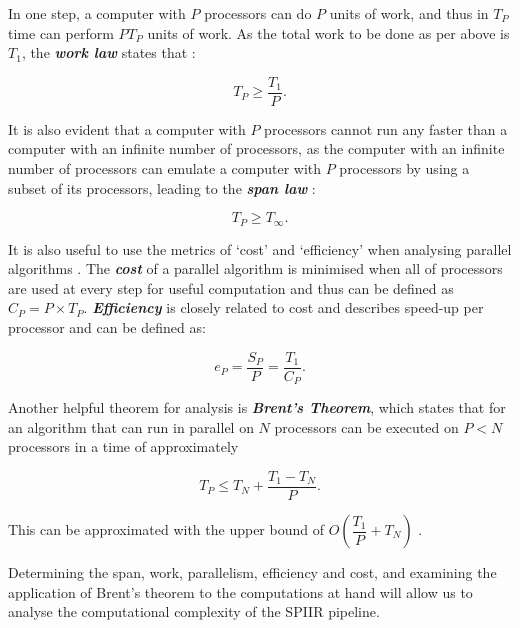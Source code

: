 \documentclass{article}
\begin{document}
In one step, a computer with \(P\) processors can do \(P\) units of work, and thus in \(T_P\) time can perform \(PT_P\) units of work.
As the total work to be done as per above is \(T_1\), the \textit{\textbf{work law}} states that \cite{CLRS_parallel}:

\begin{equation} \label{eq:work_law}
    T_P \geq \dfrac{T_1}{P}.
\end{equation}

It is also evident that a computer with \(P\) processors cannot run any faster than a computer with an infinite number of processors, as the computer with an infinite number of processors can emulate a computer with \(P\) processors by using a subset of its processors, leading to the \textit{\textbf{span law}} \cite{CLRS_parallel}:

\begin{equation} \label{eq:span_law}
    T_P \geq T_\infty.
\end{equation}

It is also useful to use the metrics of `cost' and `efficiency' when analysing parallel algorithms \cite{brent}.
The \textit{\textbf{cost}} of a parallel algorithm is minimised when all of processors are used at every step for useful computation and thus can be defined as \(C_P = P\times{T_P}\).
\textit{\textbf{Efficiency}} is closely related to cost and describes speed-up per processor and can be defined as:

\begin{equation} \label{eq:efficiency}
    e_P = \dfrac{S_P}{P} = \dfrac{T_1}{C_P}.
\end{equation}

Another helpful theorem for analysis is \textit{\textbf{Brent's Theorem}}, which states that for an algorithm that can run in parallel on \(N\) processors can be executed on \(P < N\) processors in a time of approximately \cite{BrentsLaw}

\begin{equation} \label{eq:brents_law}
    T_P \leq T_N + \dfrac{T_1-T_N}{P}.
\end{equation}

This can be approximated with the upper bound of \(O(\dfrac{T_1}{P} + T_N)\) \cite{brent}.

Determining the span, work, parallelism, efficiency and cost, and examining the application of Brent's theorem to the computations at hand will allow us to analyse the computational complexity of the SPIIR pipeline.
\end{document}
